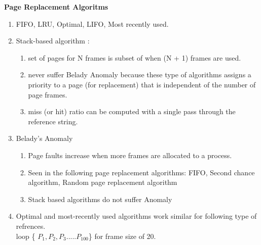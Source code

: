 
\centerline{\textbf{ \LARGE Page Replacement Algoritms}}




\begin{enumerate}

  \item FIFO, LRU, Optimal, LIFO, Most recently used.

  \item Stack-based algorithm :
      \begin{enumerate}
          \item set of pages for N frames is subset of when (N + 1) frames are used.
          \item never suffer Belady Anomaly because these type of algorithms assigns a priority to a page (for replacement)
                that is independent of the number of page frames.
          \item miss (or hit) ratio can be computed with a single pass through the reference string.
      \end{enumerate}

  \item Belady’s Anomaly
      \begin{enumerate}
          \item Page faults increase when more frames are allocated to a process.
          \item Seen in the following page replacement algorithms: FIFO, Second chance algorithm, Random page replacement algorithm
          \item Stack based algorithms do not suffer Anomaly
      \end{enumerate}


  \item Optimal and most-recently used algorithms work similar for following type of refrences. \\loop \{ \(P_1, P_2, P_3 ..... P_{100} \)\} for frame size of 20.



\end{enumerate}








